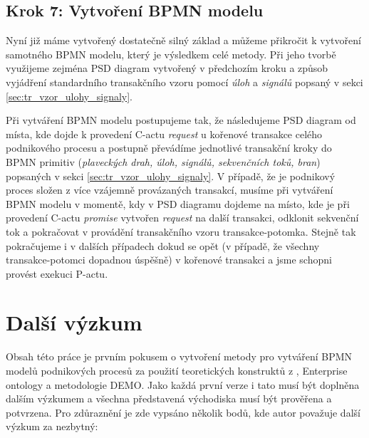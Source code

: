 \subsection{Krok 7: Vytvoření BPMN modelu}
Nyní již máme vytvořený dostatečně silný základ a můžeme přikročit k vytvoření samotného BPMN modelu, který je výsledkem celé metody. Při jeho tvorbě využijeme zejména PSD diagram vytvořený v předchozím kroku a způsob vyjádření standardního transakčního vzoru pomocí \textit{úloh} a \textit{signálů} popsaný v sekci \ref{sec:tr_vzor_ulohy_signaly}.

Při vytváření BPMN modelu postupujeme tak, že následujeme PSD diagram od místa, kde dojde k provedení C-actu \textit{request} u kořenové transakce celého podnikového procesu a postupně převádíme jednotlivé transakční kroky do BPMN primitiv (\textit{plaveckých drah, úloh, signálů, sekvenčních toků, bran}) popsaných v sekci \ref{sec:tr_vzor_ulohy_signaly}. V případě, že je podnikový proces složen z více vzájemně provázaných transakcí, musíme při vytváření BPMN modelu v momentě, kdy v PSD diagramu dojdeme na místo, kde je při provedení C-actu \textit{promise} vytvořen \textit{request} na další transakci, odklonit sekvenční tok a pokračovat v provádění transakčního vzoru transakce-potomka. Stejně tak pokračujeme i v dalších případech dokud se opět  (v případě, že všechny transakce-potomci dopadnou úspěšně) v kořenové transakci a jsme schopni provést exekuci P-actu.


\section{Další výzkum} \label{sec:dalsi_vyzkum}

Obsah této práce je prvním pokusem o vytvoření metody pro vytváření BPMN modelů podnikových procesů za použití teoretických konstruktů z \ptheory{}, Enterprise ontology a metodologie DEMO. Jako každá první verze i tato musí být doplněna dalším výzkumem a všechna představená východiska musí být prověřena a potvrzena. Pro zdůraznění je zde vypsáno několik bodů, kde autor považuje další výzkum za nezbytný:

